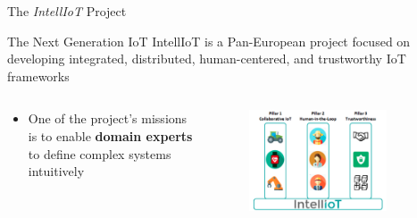 \begin{frame}{The \textit{IntellIoT} Project}
    \begin{block}{The Next Generation IoT}
        IntellIoT is a Pan-European project focused on developing integrated, distributed, human-centered, and trustworthy IoT frameworks
    \end{block}

    \begin{columns}
        \begin{column}{0.45\textwidth}
            \begin{itemize}
                \item One of the project's missions is to enable \textbf{domain experts} to define complex systems intuitively
            \end{itemize}
        \end{column}
        \begin{column}{0.55\textwidth}
            \begin{figure}
                \centering
                \includegraphics[width=0.8\textwidth]{images/intelliot-pillars.png}
            \end{figure}
        \end{column}
    \end{columns}
\end{frame}